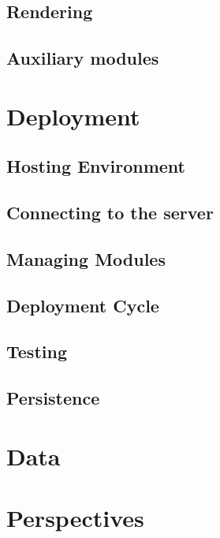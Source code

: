\documentclass[11pt, a4paper]{report}
\begin{document}
\subsection{Rendering}
\subsection{Auxiliary modules}


\section{Deployment}
\subsection{Hosting Environment}
\subsection{Connecting to the server}
\subsection{Managing Modules}
\subsection{Deployment Cycle}
\subsection{Testing}
\subsection{Persistence}


\section{Data}


\section{Perspectives}
\end{document}
